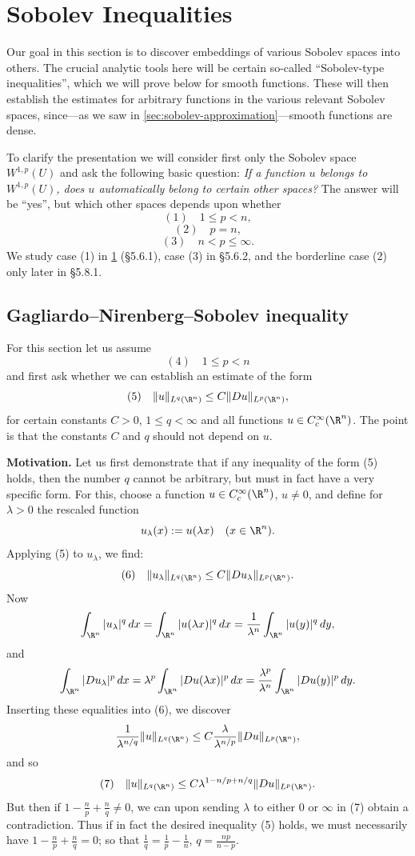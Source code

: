 \section{Sobolev Inequalities}
\label{sec:sobolev-inequalities}

Our goal in this section is to discover embeddings of various Sobolev spaces into others. The crucial analytic tools here will be certain so-called ``Sobolev-type inequalities'', which we will prove below for smooth functions. These will then establish the estimates for arbitrary functions in the various relevant Sobolev spaces, since---as we saw in \cref{sec:sobolev-approximation}---smooth functions are dense.

To clarify the presentation we will consider first only the Sobolev space $W^{1,p}(U)$ and ask the following basic question: \textit{If a function $u$ belongs to $W^{1,p}(U)$, does $u$ automatically belong to certain other spaces?} The answer will be ``yes'', but which other spaces depends upon whether
$$(1) \quad 1 \le p < n,$$
$$(2) \quad p = n,$$
$$(3) \quad n < p \le \infty.$$
We study case (1) in \cref{sec:sobolev-inequalities} (§5.6.1), case (3) in §5.6.2, and the borderline case (2) only later in §5.8.1.

\subsection{Gagliardo--Nirenberg--Sobolev inequality}

For this section let us assume
$$(4) \quad 1 \le p < n$$
and first ask whether we can establish an estimate of the form
$$(5) \quad \|u\|_{L^q(\R^n)} \le C\|Du\|_{L^p(\R^n)},$$
for certain constants $C > 0$, $1 \le q < \infty$ and all functions $u \in C_c^\infty(\R^n)$. The point is that the constants $C$ and $q$ should not depend on $u$.

\textbf{Motivation.} Let us first demonstrate that if any inequality of the form (5) holds, then the number $q$ cannot be arbitrary, but must in fact have a very specific form. For this, choose a function $u \in C_c^\infty(\R^n)$, $u \ne 0$, and define for $\lambda > 0$ the rescaled function
$$u_\lambda(x) := u(\lambda x) \quad (x \in \R^n).$$
Applying (5) to $u_\lambda$, we find:
$$(6) \quad \|u_\lambda\|_{L^q(\R^n)} \le C\|Du_\lambda\|_{L^p(\R^n)}.$$
Now
$$\int_{\R^n} |u_\lambda|^q\,dx = \int_{\R^n} |u(\lambda x)|^q\,dx = \frac{1}{\lambda^n} \int_{\R^n} |u(y)|^q\,dy,$$
and
$$\int_{\R^n} |Du_\lambda|^p\,dx = \lambda^p \int_{\R^n} |Du(\lambda x)|^p\,dx = \frac{\lambda^p}{\lambda^n} \int_{\R^n} |Du(y)|^p\,dy.$$
Inserting these equalities into (6), we discover
$$\frac{1}{\lambda^{n/q}} \|u\|_{L^q(\R^n)} \le C \frac{\lambda}{\lambda^{n/p}} \|Du\|_{L^p(\R^n)},$$
and so
$$(7) \quad \|u\|_{L^q(\R^n)} \le C\lambda^{1 - n/p + n/q} \|Du\|_{L^p(\R^n)}.$$
But then if $1 - \frac{n}{p} + \frac{n}{q} \ne 0$, we can upon sending $\lambda$ to either $0$ or $\infty$ in (7) obtain a contradiction. Thus if in fact the desired inequality (5) holds, we must necessarily have $1 - \frac{n}{p} + \frac{n}{q} = 0$; so that $\frac{1}{q} = \frac{1}{p} - \frac{1}{n}$, $q = \frac{np}{n-p}$.

